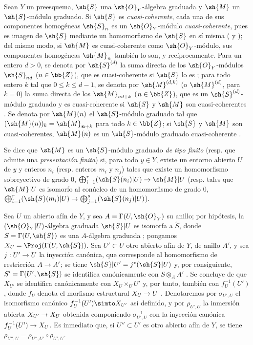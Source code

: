 \documentclass[oneside,10pt]{amsart}
\makeatletter
\renewcommand{\leq}{\leqslant}
\newcommand{\ega@arrow}[2]{\mathchoice{#1}{#2}{#2}{#2}}
\renewcommand{\to}{\ega@arrow{\longrightarrow}{\rightarrow}}
\newcommand{\oldpage}[2][]{\marginnote{\normalfont\footnotesize\textbf{#1}~|~#2}\ignorespaces}
\let\EGAOriginalLabel\label
\renewcommand{\label}[1]{\phantomsection\EGAOriginalLabel{#1}}
\makeatother
\begin{document}
\begin{env}[3.1.1]
\label{II.3.1.1}
Sean $Y$ un preesquema, $\sh{S}$ una $\sh{O}_Y$-álgebra graduada y $\sh{M}$ un $\sh{S}$-módulo graduado.
Si $\sh{S}$ es \emph{cuasi-coherente}, cada una de sus componentes homogéneas $\sh{S}_n$ es un $\sh{O}_Y$-módulo \emph{cuasi-coherente}, pues es imagen de $\sh{S}$ mediante un homomorfismo de $\sh{S}$ en sí misma ( y ); del mismo modo, si $\sh{M}$ es cuasi-coherente como $\sh{O}_Y$-módulo, sus componentes homogéneas $\sh{M}_n$ también lo son, y recíprocamente.
Para un entero $d>0$, se denota por $\sh{S}^{(d)}$ la suma directa de los $\sh{O}_Y$-módulos $\sh{S}_{nd}$ ($n\in\bb{Z}$), que es cuasi-coherente si $\sh{S}$ lo es ; para todo entero $k$ tal que $0\leq k\leq d-1$, se denota por $\sh{M}^{(d,k)}$ (o $\sh{M}^{(d)}$, para $k=0$) la suma directa de los $\sh{M}_{nd+k}$ ($n\in\bb{Z}$), que es un $\sh{S}^{(d)}$-módulo graduado y es cuasi-coherente si $\sh{S}$ y $\sh{M}$ son cuasi-coherentes .
Se denota por $\sh{M}(n)$ el $\sh{S}$-módulo graduado tal que $(\sh{M}(n))_k=\sh{M}_{\boldsymbol n+k}$ para todo $k\in\bb{Z}$; si $\sh{S}$ y $\sh{M}$ son cuasi-coherentes, $\sh{M}(n)$ es un $\sh{S}$-módulo graduado cuasi-coherente .

Se dice que $\sh{M}$ es un $\sh{S}$-módulo graduado \emph{de tipo finito} (resp. que admite una \emph{presentación finita}) si, para todo $y\in Y$, existe un entorno abierto $U$ de $y$ y enteros $n_i$ (resp. enteros $m_i$ y $n_j$) tales que existe un homomorfismo sobreyectivo de grado $0$, $\bigoplus_{i=1}^r(\sh{S}(n_i)|U)\to\sh{M}|U$ (resp. tales que $\sh{M}|U$ es isomorfo al conúcleo de un homomorfismo de grado $0$, $\bigoplus_{i=1}^r(\sh{S}(m_i)|U)\to\bigoplus_{j=1}^s(\sh{S}(n_j)|U)$).

Sea $U$ un abierto afín de $Y$, y sea $A=\Gamma(U,\sh{O}_Y)$ su anillo; por hipótesis, la $(\sh{O}_Y|U)$-álgebra graduada $\sh{S}|U$ es isomorfa a $\widetilde{S}$, donde $S=\Gamma(U,\sh{S})$ es una $A$-álgebra graduada ;
\oldpage[II]{50}
pongamos $X_U=\Proj(\Gamma(U,\sh{S}))$.
Sea $U'\subset U$ otro abierto afín de $Y$, de anillo $A'$, y sea $j:U'\to U$ la inyección canónica, que corresponde al homomorfismo de restricción $A\to A'$; se tiene $\sh{S}|U'=j^*(\sh{S}|U)$ y, por consiguiente, $S'=\Gamma(U',\sh{S})$ se identifica canónicamente con $S\otimes_AA'$ .
Se concluye de  que $X_{U'}$ se identifica canónicamente con $X_U\times_U U'$ y, por tanto, también con $f_U^{-1}(U')$, donde $f_U$ denota el morfismo estructural $X_U\to U$ .
Denotaremos por $\sigma_{U',U}$ el isomorfismo canónico $f_U^{-1}(U')\simto X_{U'}$ así definido, y por $\rho_{U',U}$ la inmersión abierta $X_{U'}\to X_U$ obtenida componiendo $\sigma_{U',U}^{-1}$ con la inyección canónica $f_U^{-1}(U')\to X_U$.
Es inmediato que, si $U''\subset U'$ es otro abierto afín de $Y$, se tiene $\rho_{U'',U}=\rho_{U'',U'}\circ\rho_{U',U}$.
\end{env}
\end{document}
